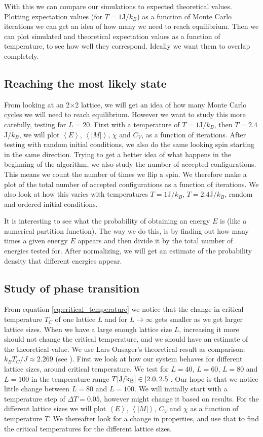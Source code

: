 \documentclass[reprint, english,notitlepage,nofootinbib]{revtex4-1}  %
\begin{document}
With this we can compare our simulations to expected theoretical values. Plotting expectation values (for $T=1$J/$k_B$) as a function of Monte Carlo iterations we can get an idea of how many we need to reach equilibrium. Then we can plot simulated and theoretical expectation values as a function of temperature, to see how well they correspond. Ideally we want them to overlap completely.

\subsection{Reaching the most likely state}
From looking at an 2$\times$2 lattice, we will get an idea of how many Monte Carlo cycles we will need to reach equilibrium. However we want to study this more carefully, testing for $L=20$. First with a temperature of $T = 1 $J$/k_B$, then $T = 2.4 $J$/k_B$, we will plot $\left<E\right>$, $\left<|M|\right>$, $\chi$ and $C_V$, as a function of iterations. After testing with random initial conditions, we also do the same looking spin starting in the same direction. Trying to get a better idea of what happens in the beginning of the algorithm, we also study the number of accepted configurations. This means we count the number of times we flip a spin. We therefore make a plot of the total number of accepted configurations as a function of iterations. We also look at how this varies with temperatures $T = 1$J$/k_B$, $T=2.4$J$/k_B$, random and ordered initial conditions.

It is interesting to see what the probability of obtaining an energy $E$ is (like a numerical partition function). The way we do this, is by finding out how many times a given energy $E$ appears and then divide it by the total number of energies tested for. After normalizing, we will get an estimate of the probability density that different energies appear.

\subsection{Study of phase transition}

From equation \eqref{eq:critical_temperature} we notice that the change in critical temperature $T_C$ of one lattice $L$ and for $L\rightarrow\infty$ gets smaller as we get larger lattice sizes. When we have a large enough lattice size $L$, increasing it more should not change the critical temperature, and we should have an estimate of the theoretical value. We use Lars Onsager's theoretical result as comparison: $k_BT_C/J \approx 2.269$ (see \cite{larsonsager}). First we look at how our system behaves for different lattice sizes, around critical temperature. We test for $L=40$, $L=60$, $L=80$ and $L=100$ in the temperature range $T[\rm{J}/k_B]\in [2.0, 2.5]$. Our hope is that we notice little change between $L=80$ and $L=100$. We will initially start with a temperature step of $\Delta T = 0.05$, however might change it based on results. For the different lattice sizes we will plot $\left<E\right>$, $\left<|M|\right>$, $C_V$ and $\chi$ as a function of temperature $T$. We thereafter look for a change in properties, and use that to find the critical temperatures for the different lattice sizes.
\end{document}
